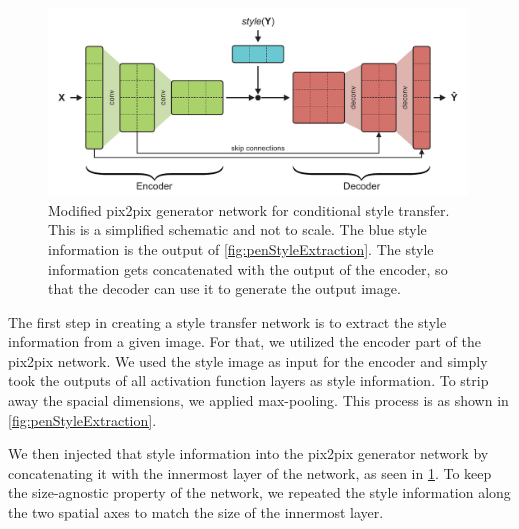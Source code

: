 \begin{figure}
  \centering
  \includegraphics[width=0.99\textwidth]{../assets/pen_style_transfer/modifiedPix2Pix.pdf}
  \caption[Modified \gls{pix2pix} generator network for conditional style transfer]{Modified \gls{pix2pix} generator network for conditional style transfer. This is a simplified schematic and not to scale. The blue style information is the output of \cref{fig:penStyleExtraction}. The style information gets concatenated with the output of the encoder, so that the decoder can use it to generate the output image.}
  \label{fig:modifiedConditionalPix2Pix}
\end{figure}

The first step in creating a style transfer network is to extract the style information from a given image. For that, we utilized the encoder part of the \gls{pix2pix} network. We used the style image as input for the encoder and simply took the outputs of all activation function layers as style information. To strip away the spacial dimensions, we applied max-pooling. This process is as shown in \cref{fig:penStyleExtraction}.


We then injected that style information into the \gls{pix2pix} generator network by concatenating it with the innermost layer of the network, as seen in \cref{fig:modifiedConditionalPix2Pix}. To keep the size-agnostic property of the network, we repeated the style information along the two spatial axes to match the size of the innermost layer.

